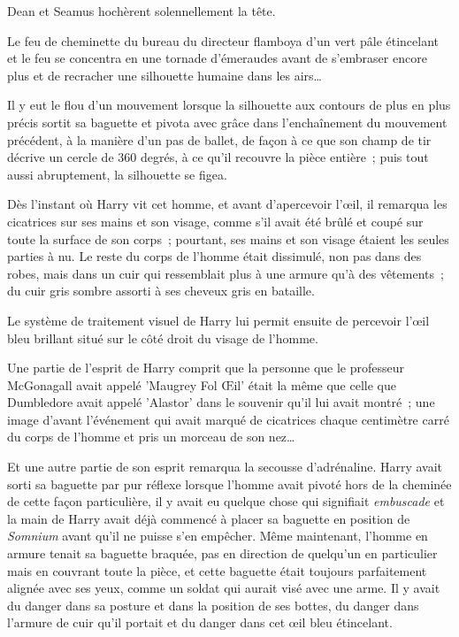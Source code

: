 Dean et Seamus hochèrent solennellement la tête.


Le feu de cheminette du bureau du directeur flamboya d'un vert pâle étincelant et le feu se concentra en une tornade d'émeraudes avant de s'embraser encore plus et de recracher une silhouette humaine dans les airs…

Il y eut le flou d'un mouvement lorsque la silhouette aux contours de plus en plus précis sortit sa baguette et pivota avec grâce dans l'enchaînement du mouvement précédent, à la manière d'un pas de ballet, de façon à ce que son champ de tir décrive un cercle de 360 degrés, à ce qu'il recouvre la pièce entière~; puis tout aussi abruptement, la silhouette se figea.

Dès l'instant où Harry vit cet homme, et avant d'apercevoir l'œil, il remarqua les cicatrices sur ses mains et son visage, comme s'il avait été brûlé et coupé sur toute la surface de son corps~; pourtant, ses mains et son visage étaient les seules parties à nu. Le reste du corps de l'homme était dissimulé, non pas dans des robes, mais dans un cuir qui ressemblait plus à une armure qu'à des vêtements~; du cuir gris sombre assorti à ses cheveux gris en bataille.

Le système de traitement visuel de Harry lui permit ensuite de percevoir l'œil bleu brillant situé sur le côté droit du visage de l'homme.

Une partie de l'esprit de Harry comprit que la personne que le professeur McGonagall avait appelé 'Maugrey Fol Œil' était la même que celle que Dumbledore avait appelé 'Alastor' dans le souvenir qu'il lui avait montré~; une image d'avant l'événement qui avait marqué de cicatrices chaque centimètre carré du corps de l'homme et pris un morceau de son nez…

Et une autre partie de son esprit remarqua la secousse d'adrénaline. Harry avait sorti sa baguette par pur réflexe lorsque l'homme avait pivoté hors de la cheminée de cette façon particulière, il y avait eu quelque chose qui signifiait \emph{embuscade} et la main de Harry avait déjà commencé à placer sa baguette en position de \emph{Somnium} avant qu'il ne puisse s'en empêcher. Même maintenant, l'homme en armure tenait sa baguette braquée, pas en direction de quelqu'un en particulier mais en couvrant toute la pièce, et cette baguette était toujours parfaitement alignée avec ses yeux, comme un soldat qui aurait visé avec une arme. Il y avait du danger dans sa posture et dans la position de ses bottes, du danger dans l'armure de cuir qu'il portait et du danger dans cet œil bleu étincelant.


